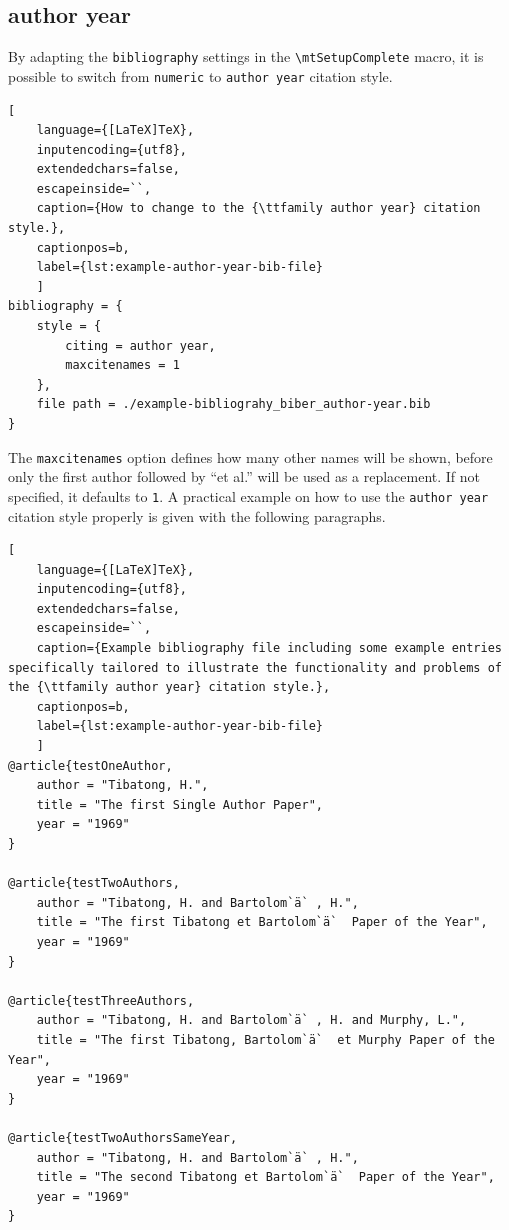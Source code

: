 		\newpage
		\subsection{\ttfamily author year}
			By adapting the \verb|bibliography| settings in the \verb|\mtSetupComplete| macro, it is possible to switch from \verb|numeric| to \verb|author year| citation style.
\begin{lstlisting}[
	language={[LaTeX]TeX},
	inputencoding={utf8}, 
	extendedchars=false,  
	escapeinside=``,
	caption={How to change to the {\ttfamily author year} citation style.},
	captionpos=b,
	label={lst:example-author-year-bib-file}
	]
bibliography = {
    style = {
        citing = author year,
        maxcitenames = 1
    },
    file path = ./example-bibliograhy_biber_author-year.bib
}
\end{lstlisting}
		The \verb|maxcitenames| option defines how many other names will be shown, before only the first author followed by \enquote{et al.} will be used as a replacement. If not specified, it defaults to \verb|1|.
		\newline A practical example on how to use the \verb|author year| citation style properly is given with the following paragraphs.
		
\begin{lstlisting}[
	language={[LaTeX]TeX},
	inputencoding={utf8}, 
	extendedchars=false,  
	escapeinside=``,
	caption={Example bibliography file including some example entries specifically tailored to illustrate the functionality and problems of the {\ttfamily author year} citation style.},
	captionpos=b,
	label={lst:example-author-year-bib-file}
	]
@article{testOneAuthor, 
	author = "Tibatong, H.",
	title = "The first Single Author Paper",
	year = "1969"
}

@article{testTwoAuthors, 
	author = "Tibatong, H. and Bartolom`ä` , H.",
	title = "The first Tibatong et Bartolom`ä`  Paper of the Year",
	year = "1969"
}

@article{testThreeAuthors, 
	author = "Tibatong, H. and Bartolom`ä` , H. and Murphy, L.",
	title = "The first Tibatong, Bartolom`ä`  et Murphy Paper of the Year",
	year = "1969"
}

@article{testTwoAuthorsSameYear, 
	author = "Tibatong, H. and Bartolom`ä` , H.",
	title = "The second Tibatong et Bartolom`ä`  Paper of the Year",
	year = "1969"
}
\end{lstlisting}

